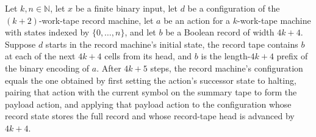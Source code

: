 \begin{lemma}
\label{Turing.StepBlock.recordTM_execute}
\leanok
{}
Let $k,n\in\mathbb N$, let $x$ be a finite binary input, let $d$ be a configuration of
the $(k+2)$-work-tape record machine, let $a$ be an action for a $k$-work-tape machine
with states indexed by $\{0,\ldots,n\}$, and let $b$ be a Boolean record of width
$4k+4$. Suppose $d$ starts in the record machine's initial state, the record tape
contains $b$ at each of the next $4k+4$ cells from its head, and $b$ is the
length-$4k+4$ prefix of the binary encoding of $a$. After $4k+5$ steps, the record
machine's configuration equals the one obtained by first setting the action's successor
state to halting, pairing that action with the current symbol on the summary tape to
form the payload action, and applying that payload action to the configuration whose
record state stores the full record and whose record-tape head is advanced by $4k+4$.
\end{lemma}


